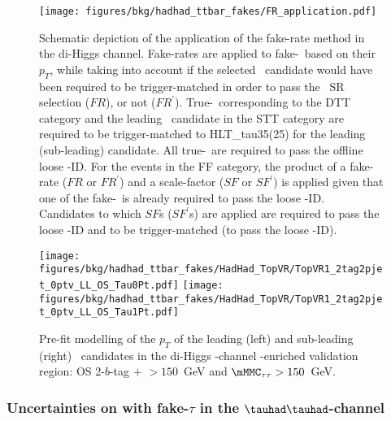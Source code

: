 \begin{figure}[!h]
\centering
\texttt{[image: figures/bkg/hadhad\_ttbar\_fakes/FR\_application.pdf]}
     \caption{Schematic depiction of the application of the fake-rate method in the di-Higgs \hadhad channel. Fake-rates are applied to fake-\tauhad\ based on their $p_T$, while taking into account if the selected \tauhad\ candidate would have been required to be trigger-matched in order to pass the \hadhad\ SR selection ($FR$), or not ($FR^\prime$). True-\tauhad\ corresponding to the DTT category and the leading \tauhad\ candidate in the STT category are required to be trigger-matched to HLT\_tau35(25) for the leading (sub-leading) candidate. All true-\tauhad\ are required to pass the offline loose \tauhad-ID. For the events in the FF category, the product of a fake-rate ($FR$ or $FR^\prime$) and a scale-factor ($SF$ or $SF^\prime$) is applied given that one of the fake-\tauhad\ is already required to pass the loose \tauhad-ID. Candidates to which $SF$s ($SF^{\prime}$s) are applied are required to pass the loose \tauhad-ID and to be trigger-matched (to pass the loose \tauhad-ID).}      
       \label{fig:FRMethodDiagram}
\end{figure}

\begin{figure}[!h]
\centering
\texttt{[image: figures/bkg/hadhad\_ttbar\_fakes/HadHad\_TopVR/TopVR1\_2tag2pjet\_0ptv\_LL\_OS\_Tau0Pt.pdf]}
\texttt{[image: figures/bkg/hadhad\_ttbar\_fakes/HadHad\_TopVR/TopVR1\_2tag2pjet\_0ptv\_LL\_OS\_Tau1Pt.pdf]}
\caption{Pre-fit modelling of the $p_T$ of the leading (left) and sub-leading (right) \tauhad\ candidates in the di-Higgs \hadhad-channel \ttbar-enriched validation region: OS 2-$b$-tag $+$ \mbb$ >150$~GeV and $\mMMC_{\tau\tau}>150$~GeV.}
        \label{fig:hadhadFRMethodTauPtModelling}
\end{figure}

\subsubsection{Uncertainties on \ttbar with fake-$\tau$ in the $\tauhad\tauhad$-channel}


